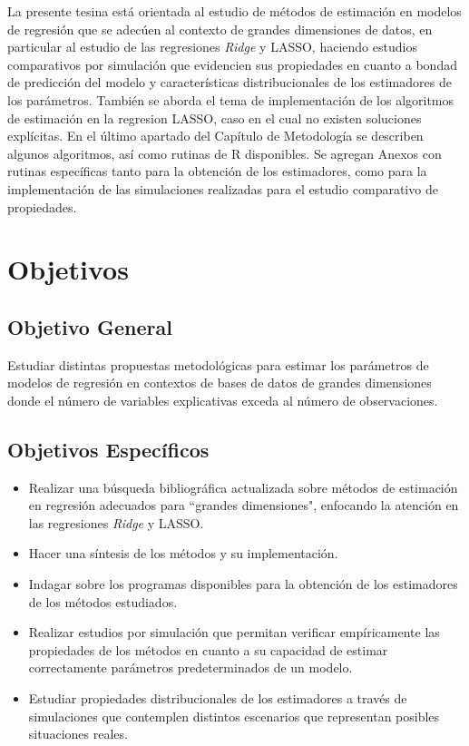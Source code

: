 \documentclass[a4paper,12pt]{report}
\begin{document}
La presente tesina está orientada al estudio de métodos de estimación en modelos de regresión que se adecúen al contexto de grandes dimensiones de datos, en particular al estudio de las regresiones \textit{Ridge} y LASSO, haciendo estudios comparativos por simulación que evidencien sus propiedades en cuanto a bondad de predicción del modelo y características distribucionales de los estimadores de los parámetros. También se aborda el tema de implementación de los algoritmos de estimación en la regresion LASSO, caso en el cual no existen soluciones explícitas. En el último apartado del Capítulo de Metodología se describen algunos algoritmos, así como rutinas de R disponibles. Se agregan Anexos con rutinas específicas tanto para la obtención de los estimadores, como para la implementación de las simulaciones realizadas para el estudio comparativo de propiedades.

\chapter{Objetivos}
\section{Objetivo General}
Estudiar distintas propuestas metodológicas para estimar los parámetros de modelos de regresión en contextos de bases de datos de grandes dimensiones donde el número de variables explicativas exceda al número de observaciones.

\section{Objetivos Específicos}
\begin{itemize}
\item Realizar una búsqueda bibliográfica actualizada sobre métodos de estimación en regresión adecuados para ``grandes dimensiones", enfocando la atención en las regresiones \textit{Ridge} y LASSO.

\item Hacer una síntesis de los métodos y su implementación.

\item Indagar sobre los programas disponibles para la obtención de los estimadores de los métodos estudiados.

\item Realizar estudios por simulación que permitan verificar empíricamente las propiedades de los métodos en cuanto a su capacidad de estimar correctamente parámetros predeterminados de un modelo.

\item Estudiar propiedades distribucionales de los estimadores a través de simulaciones que contemplen distintos escenarios que representan posibles situaciones reales.
\end{itemize}
\end{document}
